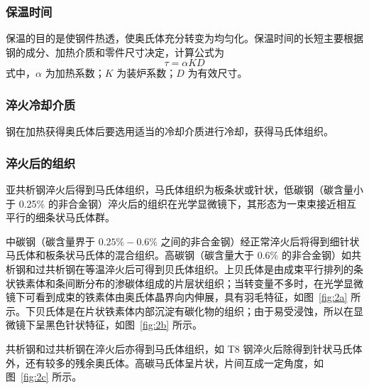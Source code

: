 \documentclass[a4paper,utf8]{article}
\newcommand{\fgref}[1]{图~\ref{#1}\xspace}
\begin{document}
        \subsubsection{保温时间}
            保温的目的是使钢件热透，使奥氏体充分转变为均匀化。保温时间的长短主要根据钢的成分、加热介质和零件尺寸决定，计算公式为
            \begin{equation}
                \tau=\alpha KD
            \end{equation}
            式中，$\alpha$ 为加热系数；$K$ 为装炉系数；$D$ 为有效尺寸。
        \subsubsection{淬火冷却介质}
            钢在加热获得奥氏体后要选用适当的冷却介质进行冷却，获得马氏体组织。
        \subsubsection{淬火后的组织}
            亚共析钢淬火后得到马氏体组织，马氏体组织为板条状或针状，低碳钢（碳含量小于 0.25\% 的非合金钢）淬火后的组织在光学显微镜下，其形态为一束束接近相互平行的细条状马氏体群。\par
            中碳钢（碳含量界于 $0.25\%-0.6\%$ 之间的非合金钢）经正常淬火后将得到细针状马氏体和板条状马氏体的混合组织。高碳钢（碳含量大于 $0.6\%$ 的非合金钢）如共析钢和过共析钢在等温淬火后可得到贝氏体组织。上贝氏体是由成束平行排列的条状铁素体和条间断分布的渗碳体组成的片层状组织；当转变量不多时，在光学显微镜下可看到成束的铁素体由奥氏体晶界向内伸展，具有羽毛特征，如\fgref{fig:2a} 所示。下贝氏体是在片状铁素体内部沉淀有碳化物的组织；由于易受浸蚀，所以在显微镜下呈黑色针状特征，如\fgref{fig:2b} 所示。\par
            共析钢和过共析钢在淬火后亦得到马氏体组织，如 T8 钢淬火后除得到针状马氏体外，还有较多的残余奥氏体。高碳马氏体呈片状，片间互成一定角度，如\fgref{fig:2c} 所示。
\end{document}
